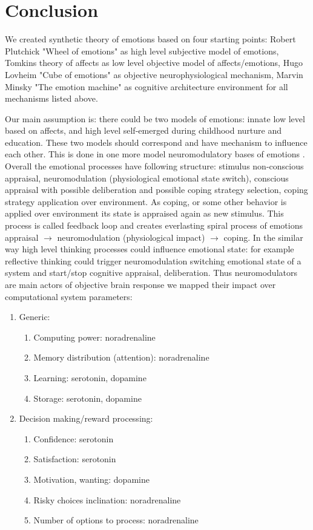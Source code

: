 \section{Conclusion}

We created synthetic theory of emotions based on four starting points: Robert Plutchick "Wheel of emotions" \cite{natureofemotions, senticcomputing} as high level subjective model of emotions, Tomkins theory of affects \cite{primer_affect_psychology} as low level objective model of affects/emotions, Hugo Lovheim "Cube of emotions" \cite{cubeofemotions} as objective neurophysiological mechanism, Marvin Minsky "The emotion machine" \cite{emotionmachine} as cognitive architecture environment for all mechanisms listed above.

Our main assumption is: there could be two models of emotions: innate low level based on affects, and high level self-emerged during childhood nurture and education. These two models should correspond and have mechanism to influence each other. This is done in one more model neuromodulatory bases of emotions \cite{cubeofemotions, neuromodulatory}.
Overall the emotional processes have following structure: stimulus non-conscious appraisal, neuromodulation (physiological emotional state switch), conscious appraisal with possible deliberation and possible coping strategy selection, coping strategy application over environment. As coping, or some other behavior is applied over environment its state is appraised again as new stimulus. This process is called feedback loop \cite{natureofemotions} and creates everlasting spiral process of emotions appraisal $\rightarrow$ neuromodulation (physiological impact) $\rightarrow$ coping. In the similar way high level thinking processes could influence emotional state: for example reflective thinking could trigger neuromodulation switching emotional state of a system and start/stop cognitive appraisal, deliberation.
Thus neuromodulators are main actors of objective brain response we mapped their impact over computational system parameters:

\begin{enumerate}
 \item  Generic:
 \begin{enumerate}
  \item  Computing power: noradrenaline
  \item  Memory distribution (attention): noradrenaline
  \item  Learning: serotonin, dopamine
  \item  Storage: serotonin, dopamine
 \end{enumerate}
 \item  Decision making/reward processing:
 \begin{enumerate}
  \item  Confidence: serotonin
  \item  Satisfaction: serotonin
  \item  Motivation, wanting: dopamine
  \item  Risky choices inclination: noradrenaline
  \item  Number of options to process: noradrenaline
 \end{enumerate}
\end{enumerate}


